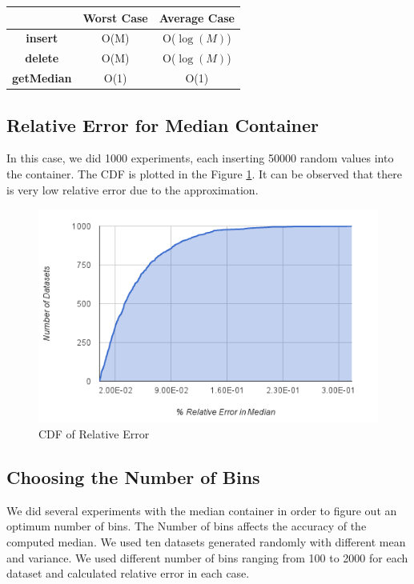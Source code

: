 \begin{table}[h]
\begin{center}
\begin{tabular}{|c|c|c|}
\hline 
 & \textbf{Worst Case} & \textbf{Average Case} \\ 
\hline 
\textbf{insert} & O(M) & O($\log(M)$) \\
\hline 
\textbf{delete} & O(M) & O($\log(M)$) \\
\hline 
\textbf{getMedian} & O(1) & O(1) \\ 
\hline 
\end{tabular} 
\end{center}
\end{table}

\subsection{Relative Error for Median Container}
In this case, we did 1000 experiments, each inserting 50000 random values into the container.
The CDF is plotted in the Figure \ref{fig:relative_error}.
It can be observed that there is very low relative error due to the approximation.


\begin{figure}[h]
\begin{center}
\includegraphics[scale=0.5]{img/relative_error}
\caption{CDF of Relative Error \label{fig:relative_error}}
\end{center}
\end{figure}

\subsection{Choosing the Number of Bins}
We did several experiments with the median container in order to figure out an optimum number of bins.
The Number of bins affects the accuracy of the computed median.
We used ten datasets generated randomly with different mean and variance.
We used different number of bins ranging from 100 to 2000 for each dataset and calculated relative error in each case.

